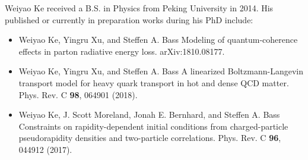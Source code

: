 \documentclass[PhD]{dukethesis2006}
\begin{document}
\doublespacing









\nocite{*}
\singlespacing

\begingroup
    \setlength{\bibsep}{10pt}
    
\endgroup


\biography
\doublespacing
Weiyao Ke received a B.S. in Physics from Peking University in 2014. His published or currently in preparation works during his PhD include:

\begin{itemize}
\singlespacing
\item Weiyao Ke, Yingru Xu, and Steffen A. Bass Modeling of quantum-coherence effects in parton radiative energy loss. arXiv:1810.08177.
\item Weiyao Ke, Yingru Xu, and Steffen A. Bass A linearized Boltzmann-Langevin transport model for heavy quark transport in hot and dense QCD matter. Phys. Rev. C {\bf 98}, 064901 (2018).
\item Weiyao Ke, J. Scott Moreland, Jonah E. Bernhard, and Steffen A. Bass Constraints on rapidity-dependent initial conditions from charged-particle pseudorapidity densities and two-particle correlations. Phys. Rev. C {\bf 96}, 044912 (2017).
\end{itemize}
\end{document}
